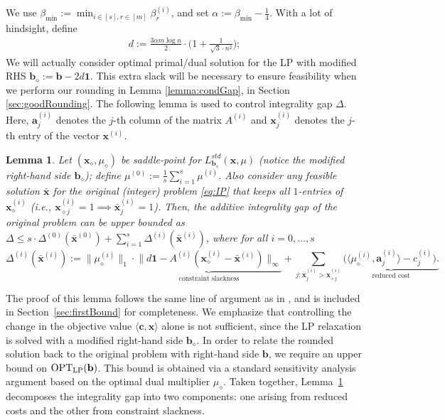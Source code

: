 \documentclass{article}
\newcommand{\av}[0]{\mathbf{a}}
\newcommand{\cv}[0]{\mathbf{c}}
\newcommand{\xv}[0]{\mathbf{x}}
\newcommand{\bv}[0]{\mathbf{b}}
\newcommand{\ones}{{\bm{1}}}
\newcommand{\colij}{\av^{(i)}_j}
\newtheorem{lemma}{Lemma}[section]
\newcommand{\OPT}{\textup{OPT}}
\begin{document}
We use $\beta_{\min} := \min_{i \in [s], r \in [m]} \beta^{(i)}_r$, and set $\alpha := \beta_{\min} - \frac{1}{4}$. With a lot of hindsight, define 
%
\begin{align}
d := \frac{3\alpha m \log n}{2} \cdot \bigg(1 + \frac{1}{\sqrt{3} \cdot  n^2}\bigg); \label{eq:defD}
\end{align}
We will actually consider optimal primal/dual solution for the LP with modified RHS $\bv_{\diamond} := \bv - 2d\ones$. This extra slack will be necessary {to ensure feasibility} when we perform our rounding in Lemma \ref{lemma:condGap}, in Section \ref{sec:goodRounding}. 
The following lemma is used to control integrality gap $\Delta$.  
Here, $\av^{(i)}_j$ denotes the $j$-th column of the matrix $A^{(i)}$ and $\xv_j^{(i)}$ denotes the $j$-th entry of the vector $\xv^{(i)}$.
\begin{lemma} \label{lemma:startBoundGap}
    Let $(\xv_{\diamond}, \mu_{\diamond})$ be saddle-point for $L^{std}_{\bv_{\diamond}}(\xv,\mu)$ (notice the modified right-hand side $\bv_{\diamond}$); define $\mu^{(0)} := \frac{1}{s} \sum_{i=1}^s \mu^{(i)}$. Also consider any feasible solution $\bar{\xv}$ for the original (integer) problem \eqref{eq:IP} that keeps all $1$-entries of $\xv^{(i)}_{\diamond}$ (i.e., $\xv^{(i)}_{\diamond j} = 1 \implies \bar{\xv}^{(i)}_j = 1$).
    Then, the additive integrality gap of the original problem can be upper bounded as 
    $\Delta \le s \cdot \Delta^{(0)}(\bar{\xv}^{(0)}) + \sum_{i = 1}^s \Delta^{(i)}(\bar{\xv}^{(i)})$, where for all $i = 0, \ldots, s$ $$\Delta^{(i)}(\bar{\xv}^{(i)}) := \big\|\mu^{(i)}_{\diamond}\big\|_1 \cdot \underbrace{\big\|d \ones - A^{(i)} (\xv^{(i)}_{\diamond} - \bar{\xv}^{(i)})\big\|_{\infty}}_{\text{constraint slackness}} + \sum_{j : \bar{\xv}^{(i)}_j > \xv^{(i)}_{\diamond j}} \underbrace{\Big(\langle \mu^{(i)}_{\diamond}, \colij \rangle - c^{(i)}_j
 \Big).}_{\text{reduced cost}}$$
\end{lemma}
The proof of this lemma follows the same line of argument as in
\cite{dyer1989probabilistic,borst2023integrality}, and is included in
Section~\ref{sec:firstBound} for completeness.
We emphasize that controlling the change in the objective value
$\langle \cv, \xv \rangle$ alone is not sufficient, since the LP relaxation is
solved with a modified right-hand side $\bv_{\diamond}$.
In order to relate the rounded solution back to the original problem with
right-hand side $\bv$, we require an upper bound on
$\OPT_{\mathrm{LP}}(\bv)$.
This bound is obtained via a standard sensitivity analysis argument based on
the optimal dual multiplier $\mu_{\diamond}$.
Taken together, Lemma~\ref{lemma:startBoundGap} decomposes the integrality gap
into two components: one arising from reduced costs and the other from
constraint slackness.
\end{document}

